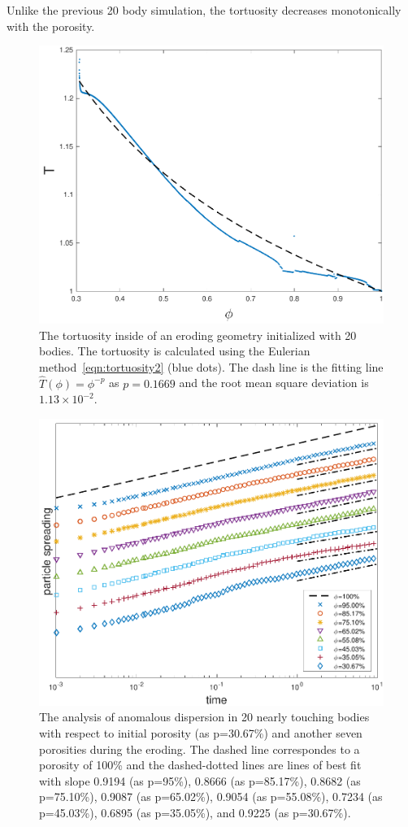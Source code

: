 \documentclass[preprint, 10pt]{elsarticle}
\begin{document}
Unlike the previous 20 body simulation, the tortuosity decreases
monotonically with the porosity. 

\begin{figure}[H]
\center
\includegraphics*[width =0.55\linewidth]{./figs/tort_eulerian20b}
\caption{\label{fig:ErodingLow20tort} The tortuosity inside of an
eroding geometry initialized with 20 bodies.  The tortuosity is
calculated using the Eulerian method~\eqref{eqn:tortuosity2} (blue
dots).  The dash line is the fitting line $\widehat{T}(\phi)=\phi^{-p}$
as $p=0.1669$ and the root mean square deviation is $1.13 \times
10^{-2}$.}
\end{figure}

\begin{figure}[H]
\center
\includegraphics*[width =0.55\linewidth]{./figs/20b_dense_second_moment_ref}
\caption{\label{fig:Eroding20anomalousLow} The analysis of anomalous
dispersion in 20 nearly touching bodies with respect to initial porosity
(as p=30.67\%) and another seven porosities during the eroding. The dashed line
correspondes to a porosity of 100\% and the dashed-dotted lines are lines
of best fit with slope 0.9194 (as p=95\%), 0.8666 (as p=85.17\%), 
0.8682 (as p=75.10\%), 0.9087 (as p=65.02\%), 
0.9054 (as p=55.08\%), 0.7234 (as p=45.03\%), 
0.6895 (as p=35.05\%), and 0.9225 (as p=30.67\%).}
\end{figure}
\end{document}
